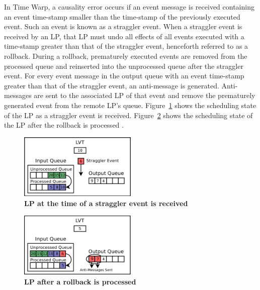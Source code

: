 \documentclass[11pt]{book}
\begin{document}
In Time Warp, a causality error occurs if an event message is received containing an event
time-stamp smaller than the time-stamp of the previously executed event.  Such an event is
known as a straggler event.  When a straggler event is received by an LP, that LP must
undo all effects of all events executed with a time-stamp greater than that of the
straggler event, henceforth referred to as a rollback.  During a rollback, prematurely
executed events are removed from the processed queue and reinserted into the unprocessed
queue after the straggler event. For every event message in the output queue with an event
time-stamp greater than that of the straggler event, an anti-message is generated.
Anti-messages are sent to the associated LP of that event and remove the
prematurely generated event from the remote LP's queue.
Figure~\ref{fig:rollback_stragglerrecvd} shows the scheduling state of the LP as
a straggler event is received.  Figure~\ref{fig:rollback_processed} shows the
scheduling state of the LP after the rollback is processed \cite{dickman}.

\begin{figure}[H]
    \centering
    \graphicspath{ {./figures/} }
    \includegraphics[width=0.5\textwidth,keepaspectratio]{rollback_recv}
    \caption{\textbf{LP at the time of a straggler event is received}}
    \label{fig:rollback_stragglerrecvd}
\end{figure}

\begin{figure}[H]
    \centering
    \graphicspath{ {./figures/} }
    \includegraphics[width=0.5\textwidth,keepaspectratio]{rollback_processed}
    \caption{\textbf{LP after a rollback is processed}}
    \label{fig:rollback_processed}
\end{figure}
\end{document}
